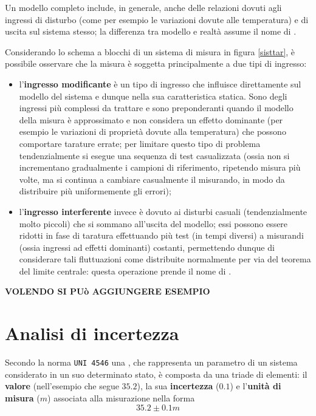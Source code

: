 	Un modello completo include, in generale, anche delle relazioni dovuti agli ingressi di disturbo (come per esempio le variazioni dovute alle temperatura) e di uscita sul sistema stesso; la differenza tra modello e realtà assume il nome di .
	
	
	Considerando lo schema a blocchi di un sistema di misura in figura \ref{sisttar}, è possibile osservare che la misura è soggetta principalmente a due tipi di ingresso:
	\begin{itemize}
		\item l'\textbf{ingresso modificante} è un tipo di ingresso che influisce direttamente sul modello del sistema e dunque nella sua caratteristica statica. Sono degli ingressi più complessi da trattare e sono preponderanti quando il modello della misura è approssimato e non considera un effetto dominante (per esempio le variazioni di proprietà dovute alla temperatura) che possono comportare tarature errate; per limitare questo tipo di problema tendenzialmente si esegue una sequenza di test casualizzata (ossia non si incrementano gradualmente i campioni di riferimento, ripetendo misura più volte, ma si continua a cambiare casualmente il misurando, in modo da distribuire più uniformemente gli errori);
		\item l'\textbf{ingresso interferente} invece è dovuto ai disturbi casuali (tendenzialmente molto piccoli) che si sommano all'uscita del modello; essi possono essere ridotti in fase di taratura effettuando più test (in tempi diversi) a misurandi (ossia ingressi ad effetti dominanti) costanti, permettendo dunque di considerare tali fluttuazioni come distribuite normalmente per via del teorema del limite centrale: questa operazione prende il nome di .
	\end{itemize}
	
	\textbf{VOLENDO SI PUò AGGIUNGERE ESEMPIO}
	
\section{Analisi di incertezza}
	Secondo la norma \texttt{UNI 4546} una , che rappresenta un parametro di un sistema considerato in un suo determinato stato, è composta da una triade di elementi: il \textbf{valore}	(nell'esempio che segue $35.2$), la sua \textbf{incertezza} ($0.1$) e l'\textbf{unità di misura} ($m$) associata alla misurazione nella forma
	\[ 35.2 \pm 0.1 m \]
	
